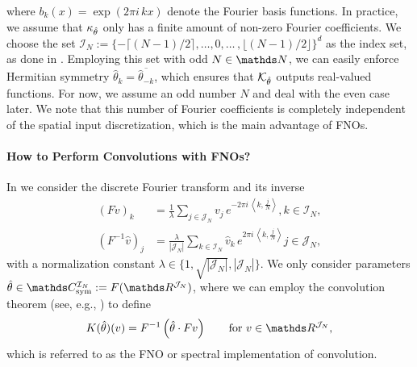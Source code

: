%
where $b_k(x) = \exp{(2\pi i\, kx)}$ denote the Fourier basis functions. In practice, we assume that $\kappa_{\hat{\theta}}$ only has a finite amount of non-zero Fourier coefficients. We choose the set $\mathcal{I}_N := \lbrace -\lceil (N-1)/2\rceil, \ldots,0, \ldots\,, \lfloor (N-1)/2 \rfloor\rbrace^d$ as the index set, as done in \cite{li2020fourier}. Employing this set with odd $N\in\N$, we can easily enforce Hermitian symmetry $\hat{\theta}_k = \overline{\hat{\theta}_{-k}}$, which ensures that $\mathcal{K}_{\hat{\theta}}$ outputs real-valued functions. For now, we assume an odd number $N$ and deal with the even case later. We note that this number of Fourier coefficients is completely independent of the spatial input discretization, which is the main advantage of FNOs.
%
%
\paragraph{How to Perform Convolutions with FNOs?}
%
%
In \cite{kabri2023resolution} we consider the discrete Fourier transform and its inverse
%
\begin{align*}
\left(Fv\right)_k &= \frac{1}{\lambda} \sum_{j \in \mathcal{J}_N} v_j\, e^{-2\pi i \, \left\langle k, \frac{j}{N}\right\rangle},  k \in \mathcal{I}_N,\\
%
\left(F^{-1}\hat{v}\right)_j &= \frac{\lambda}{|\mathcal{J}_N|}\sum_{k \in \mathcal{I}_N} \hat{v}_k\, e^{2\pi i \, \left\langle k, \frac{j}{N}\right\rangle} j \in \mathcal{J}_N,
\end{align*}
%
with a normalization constant $\lambda \in \{1, \sqrt{|\mathcal{J}_N|}, |\mathcal{J}_N|\}$. We only consider parameters $\hat\param\in \Csym^{\mathcal{I}_N} := F(\R^{\mathcal{J}_N})$, where we can employ the convolution theorem (see, e.g., \cite{grafakos}) to define
%
\begin{align}\label{eq:discfno}
K(\hat{\theta})(v) = F^{-1}\left(\hat{\theta} \cdot Fv\right) \qquad \text{for }v \in \R^{\mathcal{J}_N},
\end{align}
%
which is referred to as the FNO or spectral implementation of convolution.
%
%
